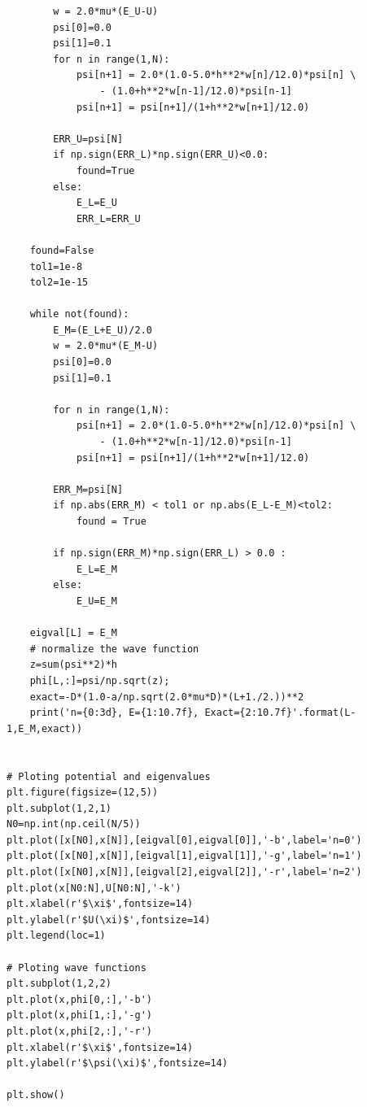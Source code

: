 \begin{verbatim}
        w = 2.0*mu*(E_U-U)
        psi[0]=0.0
        psi[1]=0.1
        for n in range(1,N):
            psi[n+1] = 2.0*(1.0-5.0*h**2*w[n]/12.0)*psi[n] \
                - (1.0+h**2*w[n-1]/12.0)*psi[n-1]
            psi[n+1] = psi[n+1]/(1+h**2*w[n+1]/12.0)

        ERR_U=psi[N]
        if np.sign(ERR_L)*np.sign(ERR_U)<0.0:
            found=True
        else:
            E_L=E_U
            ERR_L=ERR_U

    found=False
    tol1=1e-8
    tol2=1e-15

    while not(found):
        E_M=(E_L+E_U)/2.0
        w = 2.0*mu*(E_M-U)
        psi[0]=0.0
        psi[1]=0.1
 
        for n in range(1,N):
            psi[n+1] = 2.0*(1.0-5.0*h**2*w[n]/12.0)*psi[n] \
                - (1.0+h**2*w[n-1]/12.0)*psi[n-1]
            psi[n+1] = psi[n+1]/(1+h**2*w[n+1]/12.0)

        ERR_M=psi[N]
        if np.abs(ERR_M) < tol1 or np.abs(E_L-E_M)<tol2:
            found = True
    
        if np.sign(ERR_M)*np.sign(ERR_L) > 0.0 :
            E_L=E_M
        else:
            E_U=E_M

    eigval[L] = E_M
    # normalize the wave function
    z=sum(psi**2)*h
    phi[L,:]=psi/np.sqrt(z);
    exact=-D*(1.0-a/np.sqrt(2.0*mu*D)*(L+1./2.))**2
    print('n={0:3d}, E={1:10.7f}, Exact={2:10.7f}'.format(L-1,E_M,exact))


# Ploting potential and eigenvalues
plt.figure(figsize=(12,5))
plt.subplot(1,2,1)
N0=np.int(np.ceil(N/5))
plt.plot([x[N0],x[N]],[eigval[0],eigval[0]],'-b',label='n=0')
plt.plot([x[N0],x[N]],[eigval[1],eigval[1]],'-g',label='n=1')
plt.plot([x[N0],x[N]],[eigval[2],eigval[2]],'-r',label='n=2')
plt.plot(x[N0:N],U[N0:N],'-k')
plt.xlabel(r'$\xi$',fontsize=14)
plt.ylabel(r'$U(\xi)$',fontsize=14)
plt.legend(loc=1)

# Ploting wave functions
plt.subplot(1,2,2)
plt.plot(x,phi[0,:],'-b')
plt.plot(x,phi[1,:],'-g')
plt.plot(x,phi[2,:],'-r')
plt.xlabel(r'$\xi$',fontsize=14)
plt.ylabel(r'$\psi(\xi)$',fontsize=14)

plt.show()
\end{verbatim}

\normalsize


\newpage


